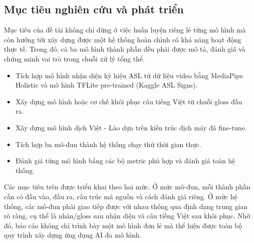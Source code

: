 ﻿\subsection{Mục tiêu nghiên cứu và phát triển}

Mục tiêu của đề tài không chỉ dừng ở việc huấn luyện riêng lẻ từng mô hình mà còn hướng tới xây dựng được một hệ thống hoàn chỉnh có khả năng hoạt động thực tế. Trong đó, cả ba mô hình thành phần đều phải được mô tả, đánh giá và chứng minh vai trò trong chuỗi xử lý tổng thể.

\begin{itemize}
    \item Tích hợp mô hình nhận diện ký hiệu ASL từ dữ liệu video bằng MediaPipe Holistic và mô hình TFLite pre-trained (Kaggle ASL Signs).
    \item Xây dựng mô hình hoặc cơ chế khôi phục câu tiếng Việt từ chuỗi gloss đầu ra.
    \item Xây dựng mô hình dịch Việt - Lào dựa trên kiến trúc dịch máy đã fine-tune.
    \item Tích hợp ba mô-đun thành hệ thống chạy thử thời gian thực.
    \item Đánh giá từng mô hình bằng các bộ metric phù hợp và đánh giá toàn hệ thống.
\end{itemize}

Các mục tiêu trên được triển khai theo hai mức. Ở mức mô-đun, mỗi thành phần cần có đầu vào, đầu ra, cấu trúc mã nguồn và cách đánh giá riêng. Ở mức hệ thống, các mô-đun phải giao tiếp được với nhau thông qua định dạng trung gian rõ ràng, cụ thể là nhãn/gloss sau nhận diện và câu tiếng Việt sau khôi phục. Nhờ đó, báo cáo không chỉ trình bày một mô hình đơn lẻ mà thể hiện được toàn bộ quy trình xây dựng ứng dụng AI đa mô hình.

